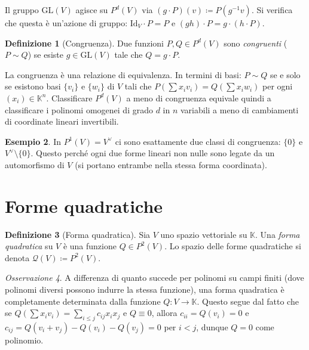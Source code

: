 \documentclass[11pt, a4paper]{book}
\theoremstyle{definition}
\newtheorem{definizione}{Definizione}[section]
\newtheorem{esempio}[definizione]{Esempio}
\theoremstyle{plain}
\theoremstyle{remark}
\newtheorem{osservazione}[definizione]{Osservazione}
\newcommand{\K}{\mathbb{K}}
\newcommand{\Id}{\mathrm{Id}}
\newcommand{\GL}{\mathrm{GL}}
\begin{document}
Il gruppo $\GL(V)$ agisce su $P^d(V)$ via $(g \cdot P)(v) \coloneqq P(g^{-1}v)$. Si verifica che questa è un'azione di gruppo: $\Id_V \cdot P = P$ e $(gh) \cdot P = g \cdot (h \cdot P)$.

\begin{defbox}
\begin{definizione}[Congruenza]
Due funzioni $P, Q \in P^d(V)$ sono \emph{congruenti} ($P \sim Q$) se esiste $g \in \GL(V)$ tale che $Q = g \cdot P$.
\end{definizione}
\end{defbox}

La congruenza è una relazione di equivalenza. In termini di basi: $P \sim Q$ se e solo se esistono basi $\{v_i\}$ e $\{w_i\}$ di $V$ tali che $P({\textstyle\sum}x_iv_i) = Q({\textstyle\sum}x_iw_i)$ per ogni $(x_i) \in \K^n$. Classificare $P^d(V)$ a meno di congruenza equivale quindi a classificare i polinomi omogenei di grado $d$ in $n$ variabili a meno di cambiamenti di coordinate lineari invertibili.

\begin{exbox}
\begin{esempio}
In $P^1(V) = V^\vee$ ci sono esattamente due classi di congruenza: $\{0\}$ e $V^\vee \setminus \{0\}$. Questo perché ogni due forme lineari non nulle sono legate da un automorfismo di $V$ (si portano entrambe nella stessa forma coordinata).
\end{esempio}
\end{exbox}

\section{Forme quadratiche}
\label{sec:forme-quadratiche}

\begin{defbox}
\begin{definizione}[Forma quadratica]
\label{def:forma-quadratica}
Sia $V$ uno spazio vettoriale su $\K$. Una \emph{forma quadratica} su $V$ è una funzione $Q \in P^2(V)$. Lo spazio delle forme quadratiche si denota $\mathcal{Q}(V) \coloneqq P^2(V)$.
\end{definizione}
\end{defbox}

\begin{osservazione}
A differenza di quanto succede per polinomi su campi finiti (dove polinomi diversi possono indurre la stessa funzione), una forma quadratica è completamente determinata dalla funzione $Q \colon V \to \K$. Questo segue dal fatto che se $Q(\sum x_iv_i) = \sum_{i \le j} c_{ij}x_ix_j$ e $Q \equiv 0$, allora $c_{ii} = Q(v_i) = 0$ e $c_{ij} = Q(v_i+v_j) - Q(v_i) - Q(v_j) = 0$ per $i < j$, dunque $Q = 0$ come polinomio.
\end{osservazione}
\end{document}
